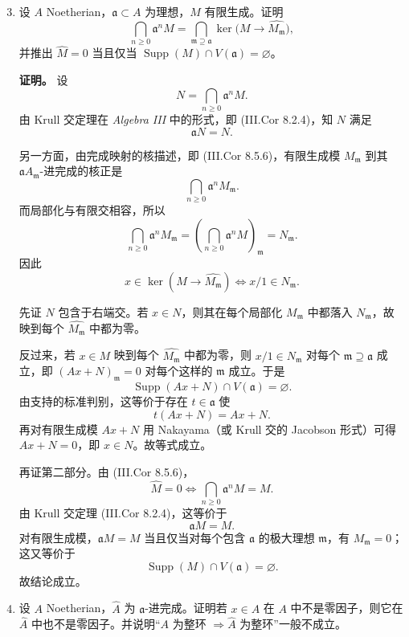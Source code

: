 \documentclass[a4paper]{ctexart}
\begin{document}
\begin{enumerate}[leftmargin=*, label=\textbf{10.\arabic*.}]
\setcounter{enumi}{2}
\item 设 \(A\) Noetherian，\(\mathfrak a\subset A\) 为理想，\(M\) 有限生成。证明
\[
\bigcap_{n\ge 0}\mathfrak a^n M
=
\bigcap_{\mathfrak m\supseteq \mathfrak a}
\ker\!\bigl(M\to \widehat{M_{\mathfrak m}}\bigr),
\]
并推出 \(\widehat M=0\) 当且仅当 \(\operatorname{Supp}(M)\cap V(\mathfrak a)=\varnothing\)。

\textbf{证明。}
设
\[
N=\bigcap_{n\ge 0}\mathfrak a^nM.
\]
由 Krull 交定理在 \textit{Algebra III} 中的形式，即 (III.Cor 8.2.4)，知 \(N\) 满足
\[
\mathfrak aN=N.
\]

另一方面，由完成映射的核描述，即 (III.Cor 8.5.6)，有限生成模 \(M_{\mathfrak m}\) 到其 \(\mathfrak aA_{\mathfrak m}\)-进完成的核正是
\[
\bigcap_{n\ge 0}\mathfrak a^n M_{\mathfrak m}.
\]
而局部化与有限交相容，所以
\[
\bigcap_{n\ge 0}\mathfrak a^n M_{\mathfrak m}
=
\left(\bigcap_{n\ge 0}\mathfrak a^n M\right)_{\mathfrak m}
=N_{\mathfrak m}.
\]
因此
\[
x\in \ker(M\to \widehat{M_{\mathfrak m}})\iff x/1\in N_{\mathfrak m}.
\]

先证 \(N\) 包含于右端交。若 \(x\in N\)，则其在每个局部化 \(M_{\mathfrak m}\) 中都落入 \(N_{\mathfrak m}\)，故映到每个 \(\widehat{M_{\mathfrak m}}\) 中都为零。

反过来，若 \(x\in M\) 映到每个 \(\widehat{M_{\mathfrak m}}\) 中都为零，则 \(x/1\in N_{\mathfrak m}\) 对每个 \(\mathfrak m\supseteq \mathfrak a\) 成立，即 \((Ax+N)_{\mathfrak m}=0\) 对每个这样的 \(\mathfrak m\) 成立。于是
\[
\operatorname{Supp}(Ax+N)\cap V(\mathfrak a)=\varnothing.
\]
由支持的标准判别，这等价于存在 \(t\in \mathfrak a\) 使
\[
t(Ax+N)=Ax+N.
\]
再对有限生成模 \(Ax+N\) 用 Nakayama（或 Krull 交的 Jacobson 形式）可得 \(Ax+N=0\)，即 \(x\in N\)。故等式成立。

再证第二部分。由 (III.Cor 8.5.6)，
\[
\widehat M=0 \iff \bigcap_{n\ge 0}\mathfrak a^nM=M.
\]
由 Krull 交定理 (III.Cor 8.2.4)，这等价于
\[
\mathfrak a M=M.
\]
对有限生成模，\(\mathfrak aM=M\) 当且仅当对每个包含 \(\mathfrak a\) 的极大理想 \(\mathfrak m\)，有 \(M_{\mathfrak m}=0\)；这又等价于
\[
\operatorname{Supp}(M)\cap V(\mathfrak a)=\varnothing.
\]
故结论成立。

\setcounter{enumi}{3}
\item 设 \(A\) Noetherian，\(\widehat A\) 为 \(\mathfrak a\)-进完成。证明若 \(x\in A\) 在 \(A\) 中不是零因子，则它在 \(\widehat A\) 中也不是零因子。并说明“\(A\) 为整环 \(\Rightarrow \widehat A\) 为整环”一般不成立。


\end{enumerate}
\end{document}
